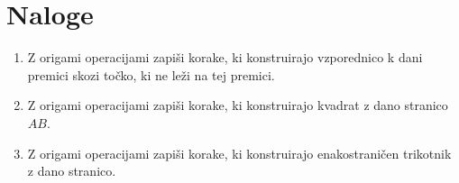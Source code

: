\section{Naloge}

\begin{enumerate}
    \item Z origami operacijami zapiši korake, ki konstruirajo vzporednico k dani premici skozi točko, ki ne leži na tej premici.
    \item Z origami operacijami zapiši korake, ki konstruirajo kvadrat z dano stranico $AB$.
    \item Z origami operacijami zapiši korake, ki konstruirajo enakostraničen trikotnik z dano stranico.
\end{enumerate}